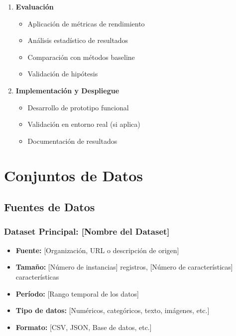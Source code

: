 \begin{enumerate}
    \item \textbf{Evaluación}
        \begin{itemize}
            \item Aplicación de métricas de rendimiento
            \item Análisis estadístico de resultados
            \item Comparación con métodos baseline
            \item Validación de hipótesis
        \end{itemize}
    
    \item \textbf{Implementación y Despliegue}
        \begin{itemize}
            \item Desarrollo de prototipo funcional
            \item Validación en entorno real (si aplica)
            \item Documentación de resultados
        \end{itemize}
\end{enumerate}

\section{Conjuntos de Datos}

\subsection{Fuentes de Datos}

\subsubsection{Dataset Principal: [Nombre del Dataset]}

\begin{itemize}
    \item \textbf{Fuente:} [Organización, URL o descripción de origen]
    \item \textbf{Tamaño:} [Número de instancias] registros, [Número de características] características
    \item \textbf{Período:} [Rango temporal de los datos]
    \item \textbf{Tipo de datos:} [Numéricos, categóricos, texto, imágenes, etc.]
    \item \textbf{Formato:} [CSV, JSON, Base de datos, etc.]
\end{itemize}

